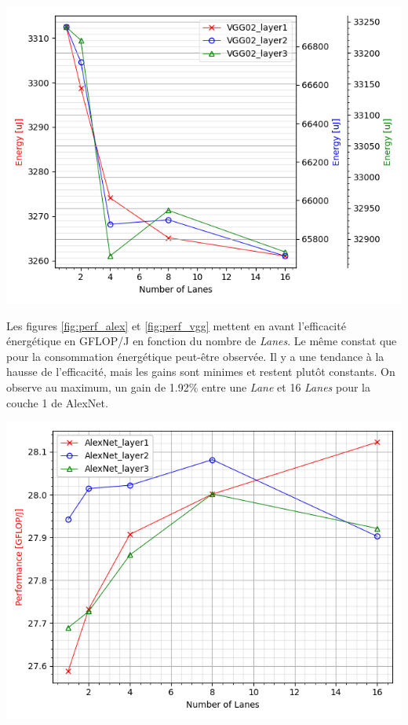 \documentclass[11pt,letterpaper]{article}
\begin{document}
\begin{multicols}{2}
    {\centering
    \includegraphics[width=\linewidth]{VGG_energy.png}
    \captionsetup{hypcap=false}
    \label{fig:energy_vgg}}
    \bigskip

    Les figures \ref{fig:perf_alex} et \ref{fig:perf_vgg} mettent en avant l'efficacité énergétique en GFLOP/J en fonction du 
    nombre de \textit{Lanes}. Le même constat que pour la consommation énergétique peut-être observée. Il y a une tendance à la
    hausse de l'efficacité, mais les gains sont minimes et restent plutôt constants. On observe au maximum, un gain de 1.92\% entre une
    \textit{Lane} et 16 \textit{Lanes} pour la couche 1 de AlexNet.

    {\centering
    \includegraphics[width=\linewidth]{Alex_performance.png}
    \captionsetup{hypcap=false}
    \label{fig:perf_alex}}
    \bigskip


\end{multicols}
\end{document}
